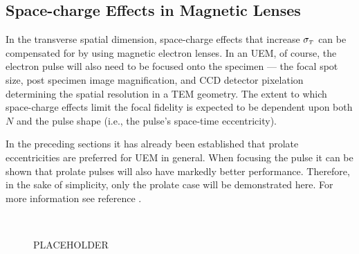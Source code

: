 \subsection{Space-charge Effects in Magnetic Lenses}

In the transverse spatial dimension, space-charge effects that increase $ \sigma_{ {\scriptscriptstyle T} } $ can be compensated for by using magnetic electron lenses.\cite{oudheusden_electron_2007,lagrange_nanosecond_2008}
In an UEM, of course, the electron pulse will also need to be focused onto the specimen --- the focal spot size, post specimen image magnification, and CCD detector pixelation determining the spatial resolution in a TEM geometry.\cite{berger_dc_2009}
The extent to which space-charge effects limit the focal fidelity is expected to be dependent upon both $N$ and the pulse shape (i.e., the pulse's space-time eccentricity).

In the preceding sections it has already been established that prolate eccentricities are preferred for UEM in general.
When focusing the pulse it can be shown that prolate pulses will also have markedly better performance.
Therefore, in the sake of simplicity, only the prolate case will be demonstrated here.
For more information see reference \cite{berger_semi-analytic_2010}.

\begin{figure}
  \centering
  \subfloat[][] {
    \label{fig:focus_lens_charge_long}
    
  }
  \\
  \subfloat[][] { 
    \label{fig:focus_lens_charge_short}
    
  }
  \caption{ PLACEHOLDER
  }
  \label{fig:focus_lens_charge}
\end{figure}

